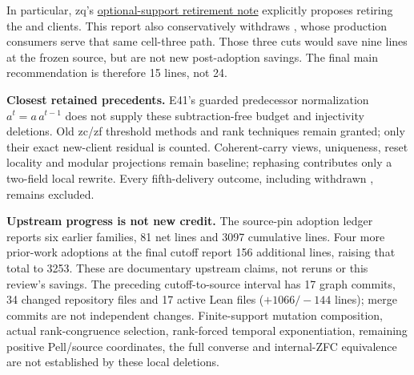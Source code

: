 In particular, zq's \href{https://github.com/VladimirReshetnikov/ProveIt/blob/60fcb2a69b7f1fdd4c3592ea5f164223cad50abe/Computability/DiophantineConsistency/research/lean-proof-simplification/2026-10-26zq/evidence/late_head_scope_addendum.md\#L82-L87}{optional-support retirement note}
explicitly proposes retiring the  and  clients. This report also conservatively withdraws , whose production consumers serve that same cell-three path. Those three cuts would save nine lines at the frozen source, but are not new post-adoption savings. The final main recommendation is therefore 15 lines, not 24.

\textbf{Closest retained precedents.} E41's guarded predecessor normalization $a^t=a\,a^{t-1}$ does not supply these subtraction-free budget and injectivity deletions. Old zc/zf threshold methods and  rank techniques remain granted; only their exact new-client residual is counted. Coherent-carry views, uniqueness, reset locality and modular projections remain baseline; rephasing contributes only a two-field local rewrite. Every fifth-delivery outcome, including withdrawn , remains excluded.

\textbf{Upstream progress is not new credit.} The source-pin adoption ledger reports six earlier families, 81 net lines and 3097 cumulative lines. Four more prior-work adoptions at the final cutoff report 156 additional lines, raising that total to 3253. These are documentary upstream claims, not reruns or this review's savings. The preceding cutoff-to-source interval has 17 graph commits, 34 changed repository files and 17 active Lean files ($+1066/-144$ lines); merge commits are not independent changes. Finite-support mutation composition, actual rank-congruence selection, rank-forced temporal exponentiation, remaining positive Pell/source coordinates, the full converse and internal-ZFC equivalence are not established by these local deletions.
